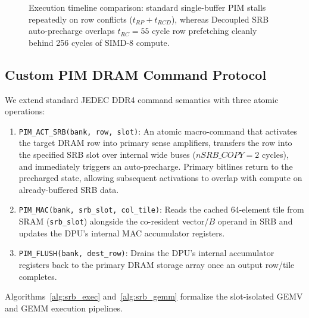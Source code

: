 \documentclass[conference]{IEEEtran}
\begin{document}
\begin{figure}[t]
{%
}
\caption{Execution timeline comparison: standard single-buffer PIM stalls repeatedly on row conflicts ($t_{RP}+t_{RCD}$), whereas Decoupled SRB auto-precharge overlaps $t_{RC}=55$ cycle row prefetching cleanly behind 256 cycles of SIMD-8 compute.}
\label{fig:pipeline_timing}
\end{figure}

\subsection{Custom PIM DRAM Command Protocol}
We extend standard JEDEC DDR4 command semantics with three atomic operations:
\begin{enumerate}
    \item \texttt{PIM\_ACT\_SRB(bank, row, slot)}: An atomic macro-command that activates the target DRAM row into primary sense amplifiers, transfers the row into the specified SRB slot over internal wide buses ($nSRB\_COPY = 2$ cycles), and immediately triggers an auto-precharge. Primary bitlines return to the precharged state, allowing subsequent activations to overlap with compute on already-buffered SRB data.
    \item \texttt{PIM\_MAC(bank, srb\_slot, col\_tile)}: Reads the cached 64-element tile from SRAM (\texttt{srb\_slot}) alongside the co-resident vector/$B$ operand in SRB and updates the DPU's internal MAC accumulator registers.
    \item \texttt{PIM\_FLUSH(bank, dest\_row)}: Drains the DPU's internal accumulator registers back to the primary DRAM storage array once an output row/tile completes.
\end{enumerate}

Algorithms~\ref{alg:srb_exec} and~\ref{alg:srb_gemm} formalize the slot-isolated GEMV and GEMM execution pipelines.
\end{document}
